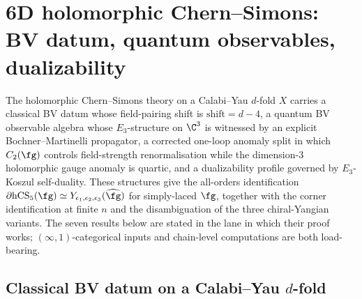
\section{6D holomorphic Chern--Simons: BV datum, quantum observables, dualizability}
\label{sec:hcs-bv-quantum-dualizability}

The holomorphic Chern--Simons theory on a Calabi--Yau $d$-fold $X$ carries a
classical BV datum whose field-pairing shift is $\mathrm{shift}=d-4$,
a quantum BV observable algebra whose $E_3$-structure on $\C^3$ is
witnessed by an explicit Bochner--Martinelli propagator, a corrected
one-loop anomaly split in which $C_2(\fg)$ controls field-strength
renormalisation while the dimension-$3$ holomorphic gauge anomaly is
quartic, and a dualizability profile governed by $E_3$-Koszul
self-duality. These structures give the all-orders identification
$\partial\hCS_5(\fg) \simeq Y_{\epsilon_1,\epsilon_2,\epsilon_3}(\widehat\fg)$
for simply-laced $\fg$, together with the corner identification at finite
$n$ and the disambiguation of the three chiral-Yangian variants. The
seven results below are stated in the lane in which their proof
works; $(\infty,1)$-categorical inputs and chain-level computations are
both load-bearing.

\subsection{Classical BV datum on a Calabi--Yau \texorpdfstring{$d$}{d}-fold}
\label{subsec:hcs-classical-bv}

